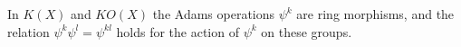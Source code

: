 In $K(X)$ and $KO(X)$ the Adams operations $\psi^k$ are ring morphisms, and the relation $\psi^k \psi^l = \psi^{kl}$ holds for the action of $\psi^k$ on these groups.
